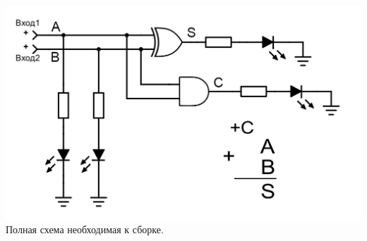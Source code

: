 \documentclass[a4paper,12pt]{article} %
\begin{document}
\begin{center}
\includegraphics[width=\textwidth]{project.png}\\
Полная схема необходимая к сборке.

\end{center}
\end{document}
